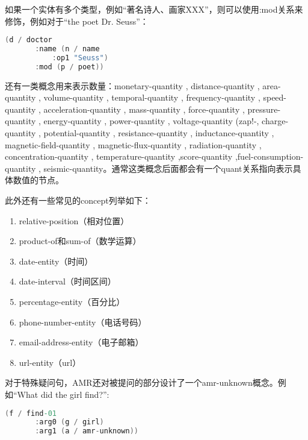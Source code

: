 \documentclass[master, winfont]{njuthesis}
\begin{document}
如果一个实体有多个类型，例如“著名诗人、画家XXX”，则可以使用:mod关系来修饰，例如对于“the poet Dr. Seuss”：
\begin{lstlisting}[language=C]
   (d / doctor
       :name (n / name
           :op1 "Seuss")
       :mod (p / poet))
\end{lstlisting}

还有一类概念用来表示数量：monetary-quantity , distance-quantity , area-quantity , volume-quantity , temporal-quantity , frequency-quantity , speed-quantity , acceleration-quantity , mass-quantity , force-quantity , pressure-quantity , energy-quantity , power-quantity , voltage-quantity (zap!-, charge-quantity , potential-quantity , resistance-quantity , inductance-quantity , magnetic-field-quantity , magnetic-flux-quantity , radiation-quantity , concentration-quantity , temperature-quantity ,score-quantity ,fuel-consumption-quantity , seismic-quantity。通常这类概念后面都会有一个quant关系指向表示具体数值的节点。

此外还有一些常见的concept列举如下：
\begin{enumerate}
	\item relative-position（相对位置）
	\item product-of和sum-of（数学运算）
	\item date-entity（时间）
	\item date-interval（时间区间）
	\item percentage-entity（百分比）
	\item phone-number-entity（电话号码）
	\item email-address-entity（电子邮箱）
	\item url-entity（url）
\end{enumerate}

对于特殊疑问句，AMR还对被提问的部分设计了一个amr-unknown概念。例如“What did the girl find?”:
\begin{lstlisting}[language=C]
   (f / find-01
       :arg0 (g / girl)
       :arg1 (a / amr-unknown))
\end{lstlisting}
\end{document}
